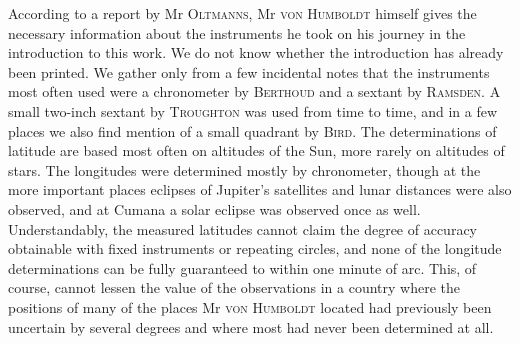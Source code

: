 According to a report by Mr \textsc{Oltmanns}, Mr \textsc{von Humboldt} himself gives the necessary information about the instruments he took on his journey in the introduction to this work. We do not know whether the introduction has already been printed. We gather only from a few incidental notes that the instruments most often used were a chronometer by \textsc{Berthoud} and a sextant by \textsc{Ramsden}. A small two-inch sextant by \textsc{Troughton} was used from time to time, and in a few places we also find mention of a small quadrant by \textsc{Bird}. The determinations of latitude are based most often on altitudes of the Sun, more rarely on altitudes of stars. The longitudes were determined mostly by chronometer, though at the more important places eclipses of Jupiter’s satellites and lunar distances were also observed, and at Cumana a solar eclipse was observed once as well. Understandably, the measured latitudes cannot claim the degree of accuracy obtainable with fixed instruments or repeating circles, and none of the longitude determinations can be fully guaranteed to within one minute of arc. This, of course, cannot lessen the value of the observations in a country where the positions of many of the places Mr \textsc{von Humboldt} located had previously been uncertain by several degrees and where most had never been determined at all.

